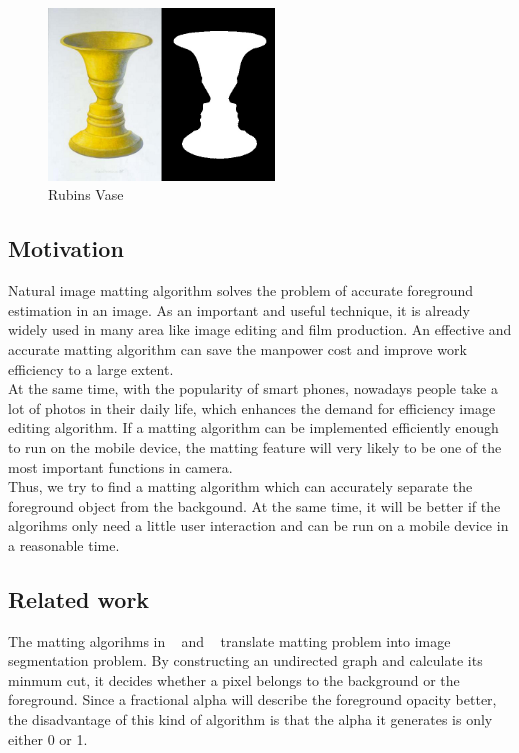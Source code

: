 \documentclass[11pt,letterpaper]{article}
\begin{document}
\begin{figure}[h]
  \begin{center}
    \includegraphics[width=6cm]{rubins_vase.jpg} 
    \caption{Rubins Vase}
  \end{center}
\end{figure}

\subsection{Motivation}
Natural image matting algorithm solves the problem of accurate foreground estimation in an image. As an important and useful technique, it is already widely used in many area like image editing and film production. An effective and accurate matting algorithm can save the manpower cost and improve work efficiency to a large extent. \\

At the same time, with the popularity of smart phones, nowadays people take a lot of photos in their daily life, which enhances the demand for efficiency image editing algorithm. If a matting algorithm can be implemented efficiently enough to run on the mobile device, the matting feature will very likely to be one of the most important functions in camera.\\ 

Thus, we try to find a matting algorithm which can accurately separate the foreground object from the backgound. At the same time, it will be better if the algorihms only need a little user interaction and can be run on a mobile device in a reasonable time. \\


\subsection{Related work}
The matting algorihms in ~\cite{Boykov:2001} and ~\cite{Li:2004} translate matting problem into image segmentation problem. By constructing an undirected graph and calculate its minmum cut, it decides whether a pixel belongs to the background or the foreground. Since a fractional alpha will describe the foreground opacity better, the disadvantage of this kind of algorithm is that the alpha it generates is only either 0 or 1. \\
\end{document}
